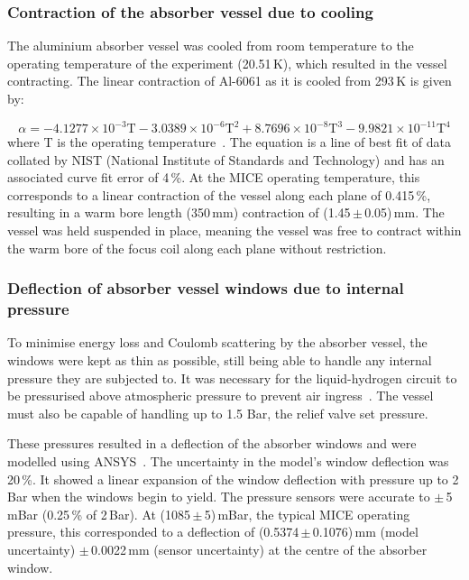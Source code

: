 \subsubsection{Contraction of the absorber vessel due to cooling}
\label{SubSect:Absorber_Contraction}

The aluminium absorber vessel was cooled from room temperature to the operating temperature of the
experiment (20.51\,K), which resulted in the vessel contracting. The linear contraction of
Al-6061 as it is cooled from 293\,K is given by:

\begin{equation}
  \alpha =-4.1277\times {10}^{-3}\mathrm{T}-3.0389\times {10}^{-6}\mathrm{T}^2+8.7696\times {10}^{-8}\mathrm{T}^3-9.9821\times {10}^{-11}\mathrm{T}^4
\end{equation}
where T is the operating temperature~\cite{Hardin}. The equation is a line of best fit of data collated by NIST
(National Institute of Standards and Technology) and has an associated curve fit error of 4\,\%.
At the MICE operating temperature, this corresponds to a linear contraction of the vessel along each plane of 0.415\,\%,
resulting in a warm bore length (350\,mm) contraction of (1.45\,$\mathrm{\pm}$\,0.05)\,mm. The vessel was held suspended in place, meaning the vessel was free to contract within the warm bore of the focus coil along each plane without restriction.

\subsubsection{Deflection of absorber vessel windows due to internal pressure}
\label{SubSect:Absorber_pressure}

To minimise energy loss and Coulomb scattering by the absorber vessel, the windows were kept as thin as
possible, still being able to handle any internal pressure they are subjected to.
It was necessary for the liquid-hydrogen circuit to be pressurised above atmospheric pressure to prevent air ingress~\cite{1748-0221-13-09-T09008}\cite{Ishimoto}.
The vessel must also be capable of handling up to 1.5 Bar, the relief valve set pressure.

These pressures resulted in a deflection of the absorber windows and were modelled using
ANSYS~\cite{NOTE155}. The uncertainty in the model's window deflection was 20\,\%. It showed a linear
expansion of the window deflection with pressure up to 2 Bar when the windows begin to yield.
The pressure sensors were accurate to $\mathrm{\pm}$\,5\,mBar (0.25\,\% of 2\,Bar). At (1085\,$\mathrm{\pm}$\,5)\,mBar, the typical MICE operating pressure, this corresponded to a deflection of (0.5374\,$\mathrm{\pm}$\,0.1076)\,mm (model uncertainty) $\mathrm{\pm}$\,0.0022\,mm (sensor uncertainty) at the centre of
the absorber window.


